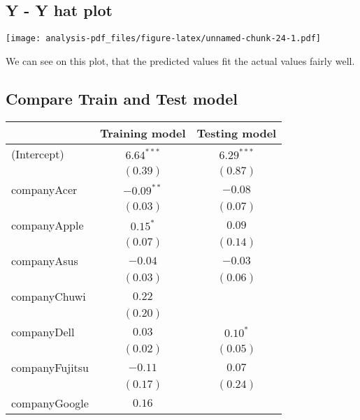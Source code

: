 \documentclass[
]{article}
\begin{document}
\hypertarget{y---y-hat-plot}{%
\subsection{Y - Y hat plot}\label{y---y-hat-plot}}

\texttt{[image: analysis-pdf\_files/figure-latex/unnamed-chunk-24-1.pdf]}

We can see on this plot, that the predicted values fit the actual values
fairly well.

\hypertarget{compare-train-and-test-model}{%
\subsection{Compare Train and Test
model}\label{compare-train-and-test-model}}

\begin{table}
\begin{center}
\begin{tabular}{l c c}
\hline
 & Training model & Testing model \\
\hline
(Intercept)                   & $6.64^{***}$  & $6.29^{***}$  \\
                              & $(0.39)$      & $(0.87)$      \\
companyAcer                   & $-0.09^{**}$  & $-0.08$       \\
                              & $(0.03)$      & $(0.07)$      \\
companyApple                  & $0.15^{*}$    & $0.09$        \\
                              & $(0.07)$      & $(0.14)$      \\
companyAsus                   & $-0.04$       & $-0.03$       \\
                              & $(0.03)$      & $(0.06)$      \\
companyChuwi                  & $0.22$        &               \\
                              & $(0.20)$      &               \\
companyDell                   & $0.03$        & $0.10^{*}$    \\
                              & $(0.02)$      & $(0.05)$      \\
companyFujitsu                & $-0.11$       & $0.07$        \\
                              & $(0.17)$      & $(0.24)$      \\
companyGoogle                 & $0.16$        &               \\

\end{tabular}
\end{center}
\end{table}
\end{document}
